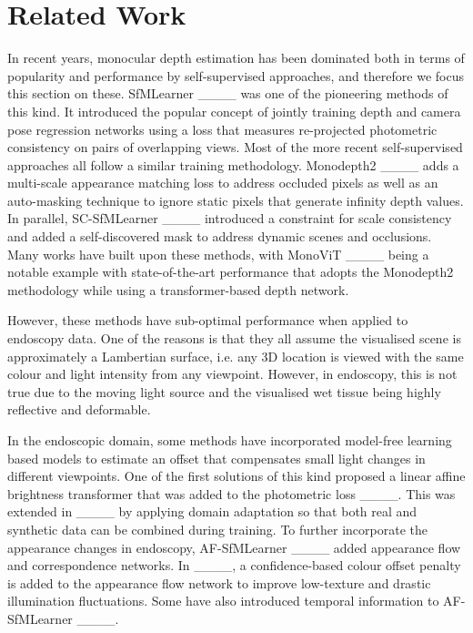 \section{Related Work}
\label{sec:lit}

In recent years, monocular depth estimation has been dominated both in terms of popularity and performance by self-supervised approaches, and therefore we focus this section on these. SfMLearner ____ was one of the pioneering methods of this kind. It introduced the popular concept of jointly training depth and camera pose regression networks using a loss that measures re-projected photometric consistency on pairs of overlapping views. Most of the more recent self-supervised approaches all follow a similar training methodology. Monodepth2 ____ adds a multi-scale appearance matching loss to address occluded pixels as well as an auto-masking technique to ignore static pixels that generate infinity depth values. In parallel, SC-SfMLearner ____ introduced a constraint for scale consistency and added a self-discovered mask to address dynamic scenes and occlusions. Many works have built upon these methods, with MonoViT ____ being a notable example with state-of-the-art performance that adopts the Monodepth2 methodology while using a transformer-based depth network. 

However, these methods have sub-optimal performance when applied to endoscopy data. One of the reasons is that they all assume the visualised scene is approximately a Lambertian surface, i.e. any 3D location is viewed with the same colour and light intensity from any viewpoint. However, in endoscopy, this is not true due to the moving light source and the visualised wet tissue being highly reflective and deformable. 

In the endoscopic domain, some methods have incorporated model-free learning based models to estimate an offset that compensates small light changes in different viewpoints. One of the first solutions of this kind proposed a linear affine brightness transformer that was added to the photometric loss ____. This was extended in ____ by applying domain adaptation so that both real and synthetic data can be combined during training.  To further incorporate the appearance changes in endoscopy, AF-SfMLearner ____ added appearance flow and correspondence networks. In ____, a conﬁdence-based colour offset penalty is added to the appearance flow network to improve low-texture and drastic illumination ﬂuctuations. Some have also introduced temporal information to AF-SfMLearner ____.

